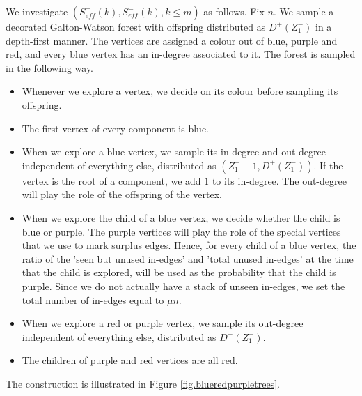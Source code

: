 We investigate $(S^+_{eff}(k),S^-_{eff}(k), k\leq m)$ as follows. Fix $n$. We sample a
decorated Galton-Watson forest with offspring distributed as $D^+(Z^-_1)$ in a depth-first manner. The vertices are assigned a colour out of blue, purple and red, and every blue vertex has an in-degree associated to it. The forest is sampled in the following way. 
\begin{itemize}
    \item Whenever we explore a vertex, we decide on its colour before sampling its offspring.
    \item The first vertex of every component is blue.
    \item When we explore a blue vertex, we sample its in-degree and out-degree independent of everything else, distributed as $(Z_1^--1,D^+(Z_1^-))$. If the vertex is the root of a component, we add $1$ to its in-degree. The out-degree will play the role of the offspring of the vertex. 
    \item When we explore the child of a blue vertex, we decide whether the child is blue or purple. The purple vertices will play the role of the special vertices that we use to mark surplus edges. Hence, for every child of a blue vertex, the ratio of the 'seen but unused in-edges' and 'total unused in-edges' at the time that the child is explored, will be used as the probability that the child is purple. Since we do not actually have a stack of unseen in-edges, we set the total number of in-edges equal to $\mu n$. 
    \item When we explore a red or purple vertex, we sample its out-degree independent of everything else, distributed as $D^+(Z_1^-)$. 
    \item The children of purple and red vertices are all red.
    \end{itemize}  
The construction is illustrated in Figure \ref{fig.blueredpurpletrees}.

